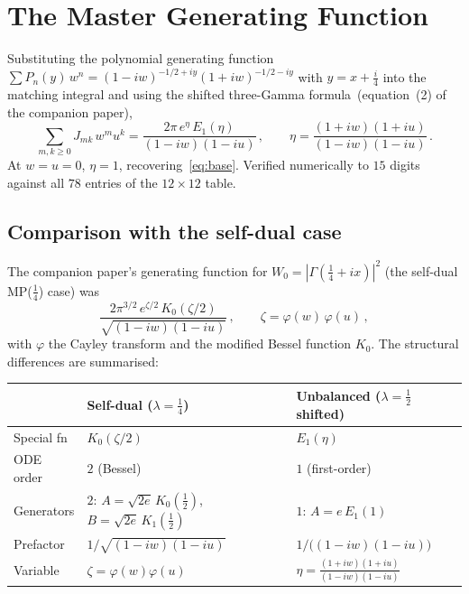 \documentclass[11pt,a4paper]{article}
\begin{document}
\section{The Master Generating Function}

Substituting the polynomial generating function
$\sum P_n(y)\,w^n = (1-iw)^{-1/2+iy}(1+iw)^{-1/2-iy}$
with $y = x + \tfrac{i}{4}$ into the matching integral and
using the shifted three-Gamma formula~(equation~(2) of the
companion paper),
\begin{equation}\label{eq:gf}
  \boxed{
  \sum_{m,k \ge 0} J_{mk}\,w^m u^k
  = \frac{2\pi\,e^{\eta}\,E_1(\eta)}{(1-iw)(1-iu)}\,,
  \qquad
  \eta = \frac{(1+iw)(1+iu)}{(1-iw)(1-iu)}\,.
  }
\end{equation}
At $w = u = 0$, $\eta = 1$, recovering~\eqref{eq:base}.
Verified numerically to $15$ digits against all $78$ entries of
the $12 \times 12$ table.

\subsection*{Comparison with the self-dual case}

The companion paper's generating function for
$W_0 = |\Gamma(\tfrac14+ix)|^2$ (the self-dual MP($\tfrac14$) case) was
\[
  \frac{2\pi^{3/2}\,e^{\zeta/2}\,K_0(\zeta/2)}
       {\sqrt{(1-iw)(1-iu)}}\,,
  \qquad
  \zeta = \varphi(w)\,\varphi(u)\,,
\]
with $\varphi$ the Cayley transform and the modified Bessel function
$K_0$.  The structural differences are summarised:

\begin{center}
\small
\begin{tabular}{@{}lp{5.5cm}p{5.5cm}@{}}
\toprule
 & Self-dual ($\lambda = \tfrac14$) & Unbalanced ($\lambda = \tfrac12$ shifted) \\
\midrule
Special fn & $K_0(\zeta/2)$ & $E_1(\eta)$ \\
ODE order & $2$ (Bessel) & $1$ (first-order) \\
Generators & $2$: $A = \sqrt{2e}\,K_0(\tfrac12)$,
              $B = \sqrt{2e}\,K_1(\tfrac12)$
            & $1$: $A = e\,E_1(1)$ \\
Prefactor & $1/\sqrt{(1-iw)(1-iu)}$ & $1/\bigl((1-iw)(1-iu)\bigr)$ \\
Variable & $\zeta = \varphi(w)\varphi(u)$ &
  $\eta = \frac{(1+iw)(1+iu)}{(1-iw)(1-iu)}$ \\
\bottomrule
\end{tabular}
\end{center}
\end{document}
